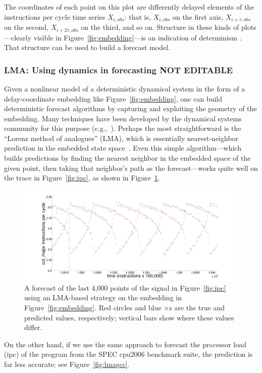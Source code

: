 The coordinates of each point on this plot are differently delayed
elements of the \col instructions per cycle time series
$X_{i,obs}$: that is, $X_{i,obs}$ on the first axis, $X_{i+\tau,obs}$ on the second,
$X_{i+2\tau,obs}$ on the third, and so on.
Structure in these kinds of plots---clearly visible in
Figure~\ref{fig:embedding}---is an indication of
determinism%
  .  That structure can be used to build a forecast model.
 \subsubsection{LMA: Using dynamics in forecasting {\color{red} NOT EDITABLE}}

Given a nonlinear model of a deterministic dynamical system in the
form of a delay-coordinate embedding like Figure~\ref{fig:embedding},
one can build deterministic forecast algorithms by capturing and
exploiting the geometry of the embedding.  Many techniques have been
developed by the dynamical systems community for this purpose
(e.g.,~\cite{weigend-book,casdagli-eubank92,Smith199250}).  Perhaps the most straightforward
is the ``Lorenz method of analogues'' (LMA), which is essentially
nearest-neighbor prediction in the embedded state
space~\cite{lorenz-analogues}.  Even this simple algorithm---which
builds predictions by finding the nearest neighbor in the embedded
space of the given point, then taking that neighbor's path as the
forecast---works quite well on the trace in Figure~\ref{fig:ipc}, as
shown in Figure~\ref{fig:lmacol}.
%
\begin{figure}[htbp]
  \centering
   \includegraphics[width=\textwidth]{figs/colPredShortTS}
    \caption{A forecast of the last 4,000 points of the signal in
      Figure~\ref{fig:ipc} using an LMA-based strategy on the
      embedding in Figure~\ref{fig:embedding}.  Red circles and blue
      $\times$s are the true and predicted values, respectively;
      vertical bars show where these values differ.}
\label{fig:lmacol}
\end{figure}
%
On the other hand, if we use the same approach to forecast the
processor load (ipc) of the \gcc program from the SPEC cpu2006 benchmark suite, the
prediction is far less accurate; see Figure~\ref{fig:lmagcc}.

